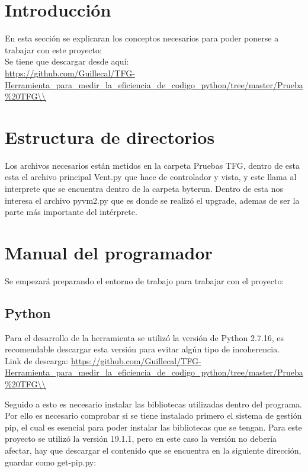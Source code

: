 
\section{Introducción}
En esta sección se explicaran los conceptos necesarios para poder ponerse a trabajar con este proyecto:\\

Se tiene que descargar desde aquí: \\

\url{https://github.com/Guillecal/TFG-Herramienta_para_medir_la_eficiencia_de_codigo_python/tree/master/Prueba%20TFG\\}

\section{Estructura de directorios}

Los archivos necesarios están metidos en la carpeta Pruebas TFG, dentro de esta esta el archivo principal Vent.py que hace de controlador y vista, y este llama al interprete que  se encuentra dentro de la carpeta byterun. Dentro de esta nos interesa el archivo pyvm2.py que es donde se realizó el upgrade, ademas de ser la parte más importante del intérprete.\\

\section{Manual del programador}
Se empezará preparando el entorno de trabajo para trabajar con el proyecto:\\

\subsection{Python}
Para el desarrollo de la herramienta se utilizó la versión de Python 2.7.16, es recomendable descargar esta versión para evitar algún tipo de incoherencia.\\

Link de descarga: \url{https://github.com/Guillecal/TFG-Herramienta_para_medir_la_eficiencia_de_codigo_python/tree/master/Prueba%20TFG\\}

Seguido a esto es necesario instalar las bibliotecas utilizadas dentro del programa. Por ello es necesario comprobar si se tiene instalado primero el sistema de gestión pip, el cual es esencial para poder instalar las bibliotecas que se tengan.
Para este proyecto se utilizó la versión 19.1.1, pero en este caso la versión no debería afectar, hay que descargar el contenido que se encuentra en la siguiente dirección, guardar como get-pip.py:\\

